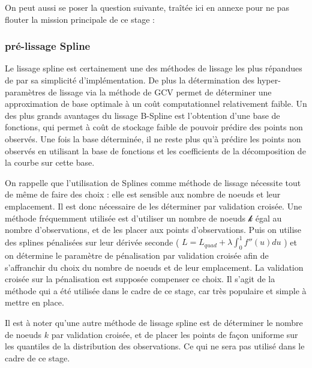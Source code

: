 On peut aussi se poser la question suivante, traîtée ici en annexe pour ne pas flouter la mission principale de ce stage :


\subsubsection{pré-lissage Spline}

Le lissage spline est certainement une des méthodes de lissage les plus répandues de par sa simplicité d'implémentation. De plus la détermination des hyper-paramètres de lissage via la méthode de GCV permet de déterminer une approximation de base optimale à un coût computationnel relativement faible. Un des plus grands avantages du lissage B-Spline est l'obtention d'une base de fonctions, qui permet à coût de stockage faible de pouvoir prédire des points non observés. Une fois la base déterminée, il ne reste plus qu'à prédire les points non observés en utilisant la base de fonctions et les coefficients de la décomposition de la courbe sur cette base.

\bigskip

On rappelle que l'utilisation de Splines comme méthode de lissage nécessite tout de même de faire des choix : elle est sensible aux nombre de noeuds et leur emplacement. Il est donc nécessaire de les déterminer par validation croisée. Une méthode fréquemment utilisée est d'utiliser un nombre de noeuds $\mathcal k$ égal au nombre d'observations, et de les placer aux points d'observations. Puis on utilise des splines pénalisées sur leur dérivée seconde ( $L = L_{quad} + \lambda \displaystyle\int_0^1 f''(u) du$ ) et on détermine le paramètre de pénalisation par validation croisée afin de s'affranchir du choix du nombre de noeuds et de leur emplacement. La validation croisée sur la pénalisation est supposée compenser ce choix. Il s'agit de la méthode qui a été utilisée dans le cadre de ce stage, car très populaire et simple à mettre en place.

Il est à noter qu'une autre méthode de lissage spline est de déterminer le nombre de noeuds $k$ par validation croisée, et de placer les points de façon uniforme sur les quantiles de la distribution des observations. Ce qui ne sera pas utilisé dans le cadre de ce stage.

\bigskip

